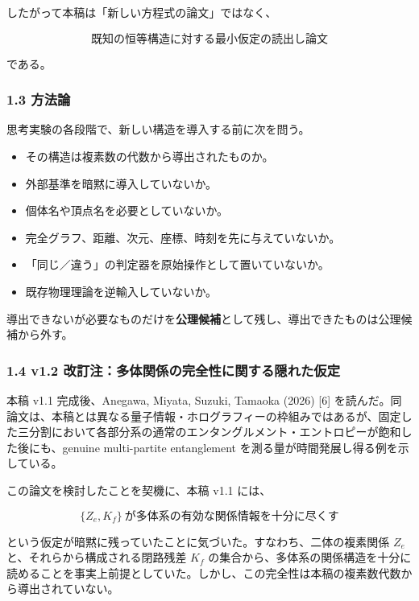 \documentclass[
  a4paper,
]{ltjsarticle}
\providecommand{\tightlist}{%
  \setlength{\itemsep}{0pt}\setlength{\parskip}{0pt}}
\begin{document}
したがって本稿は「新しい方程式の論文」ではなく、

\[
\boxed{\text{既知の恒等構造に対する最小仮定の読出し論文}}
\]

である。

\subsubsection{1.3 方法論}\label{ux65b9ux6cd5ux8ad6}

思考実験の各段階で、新しい構造を導入する前に次を問う。

\begin{itemize}
\tightlist
\item
  その構造は複素数の代数から導出されたものか。
\item
  外部基準を暗黙に導入していないか。
\item
  個体名や頂点名を必要としていないか。
\item
  完全グラフ、距離、次元、座標、時刻を先に与えていないか。
\item
  「同じ／違う」の判定器を原始操作として置いていないか。
\item
  既存物理理論を逆輸入していないか。
\end{itemize}

導出できないが必要なものだけを\textbf{公理候補}として残し、導出できたものは公理候補から外す。

\subsubsection{1.4 v1.2
改訂注：多体関係の完全性に関する隠れた仮定}\label{v1.2-ux6539ux8a02ux6ce8ux591aux4f53ux95a2ux4fc2ux306eux5b8cux5168ux6027ux306bux95a2ux3059ux308bux96a0ux308cux305fux4eeeux5b9a}

本稿 v1.1 完成後、Anegawa, Miyata, Suzuki, Tamaoka (2026) {[}6{]}
を読んだ。同論文は、本稿とは異なる量子情報・ホログラフィーの枠組みではあるが、固定した三分割において各部分系の通常のエンタングルメント・エントロピーが飽和した後にも、genuine
multi-partite entanglement を測る量が時間発展し得る例を示している。

この論文を検討したことを契機に、本稿 v1.1 には、

\[
\boxed{\{Z_e,K_f\}\ \text{が多体系の有効な関係情報を十分に尽くす}}
\]

という仮定が暗黙に残っていたことに気づいた。すなわち、二体の複素関係
\(Z_e\) と、それらから構成される閉路残差 \(K_f\)
の集合から、多体系の関係構造を十分に読めることを事実上前提としていた。しかし、この完全性は本稿の複素数代数から導出されていない。
\end{document}
